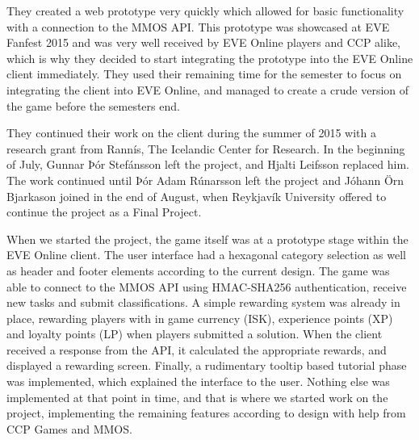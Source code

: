 	They created a web prototype very quickly which allowed for basic functionality with a connection to the MMOS API. This prototype was showcased at EVE Fanfest 2015 \cite{fanfest} and was very well received by EVE Online players and CCP alike, which is why they decided to start integrating the prototype into the EVE Online client immediately. They used their remaining time for the semester to focus on integrating the client into EVE Online, and managed to create a crude version of the game before the semesters end.

	They continued their work on the client during the summer of 2015 with a research grant from Rannís, The Icelandic Center for Research. In the beginning of July, Gunnar Þór Stefánsson left the project, and Hjalti Leifsson replaced him. The work continued until Þór Adam Rúnarsson left the project and Jóhann Örn Bjarkason joined in the end of August, when Reykjavík University offered to continue the project as a Final Project.

	When we started the project, the game itself was at a prototype stage within the EVE Online client. The user interface had a hexagonal category selection as well as header and footer elements according to the current design. The game was able to connect to the MMOS API using HMAC-SHA256 authentication, receive new tasks and submit classifications. A simple rewarding system was already in place, rewarding players with in game currency (ISK), experience points (XP) and loyalty points (LP) when players submitted a solution. When the client received a response from the API, it calculated the appropriate rewards, and displayed a rewarding screen. Finally, a rudimentary tooltip based tutorial phase was implemented, which explained the interface to the user. Nothing else was implemented at that point in time, and that is where we started work on the project, implementing the remaining features according to design with help from CCP Games and MMOS.

